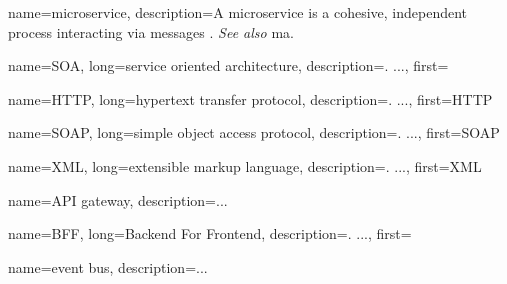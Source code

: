 {
    name=microservice,
    description={A microservice is a cohesive, independent process interacting
    via messages \autocite{Dragoni_etal_2017}. \textit{See also} \gls{ma}.} %
}

{
    name=SOA,
    long={service oriented architecture},
    description={. ...},%
    first=
}

{
    name=HTTP,
    long={hypertext transfer protocol},
    description={. ...},%
    first=HTTP %
}

{
    name=SOAP,
    long={simple object access protocol},
    description={. ...},%
    first=SOAP
}

{
    name=XML,
    long={extensible markup language},
    description={. ...},%
    first=XML
}


{
    name=API gateway,
    description={...} %
}


{
    name=BFF,
    long={Backend For Frontend},
    description={. ...},%
    first=
}

{
    name=event bus,
    description={...} %
}
